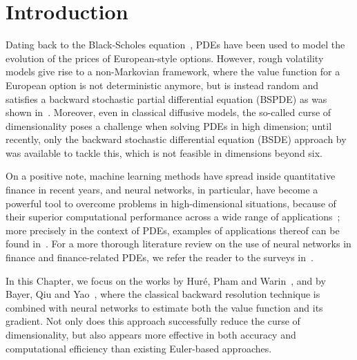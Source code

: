 \section{Introduction}
Dating back to the Black-Scholes equation~\cite{Black1973TheLiabilities}, PDEs have been used to model the evolution of the prices of European-style options. 
However, rough volatility models give rise to a non-Markovian framework, where the value function for a European option is not deterministic anymore, but is instead random and satisfies a backward stochastic partial differential equation (BSPDE) as was shown in~\cite{Bayer2022PricingSPDEs}.
Moreover, even in classical diffusive models, the so-called curse of dimensionality poses a challenge when solving PDEs in high dimension;
until recently, only the backward stochastic differential equation (BSDE) approach by~\cite{Pardoux1990AdaptedEquation} was available to tackle this, 
which is not feasible in dimensions beyond six.

On a positive note, machine learning methods have spread inside quantitative finance in recent years, and neural networks, in particular, have become a powerful tool to overcome problems in high-dimensional situations, because of their superior computational performance across a wide range of applications~\cite{Buehler2019DeepHedging, Gierjatowicz2023RobustEquations, Ruf2020NeuralReview};
more precisely in the context of PDEs, examples of applications thereof can be found in~\cite{E2017DeepEquations, Han2018SolvingLearning, Sirignano2018DGM:Equations, Jacquier2023DeepVolatility, Saporito2021Path-DependentEquations, Beck2021DeepPDEs}. 
For a more thorough literature review on the use of neural networks in finance and finance-related PDEs, we refer the reader to the surveys in~\cite{Beck2023AnEquations, Germain2021NeuralFinance}.

In this Chapter, we focus on the works by Hur{\'e}, Pham and Warin~\cite{Hure2020DeepPDEs}, and by Bayer, Qiu and Yao~\cite{Bayer2022PricingSPDEs}, where the classical backward resolution technique is combined with neural networks to estimate both the value function and its gradient. 
Not only does this approach successfully reduce the curse of dimensionality, but also appears more effective in both accuracy and computational efficiency than existing Euler-based approaches.

